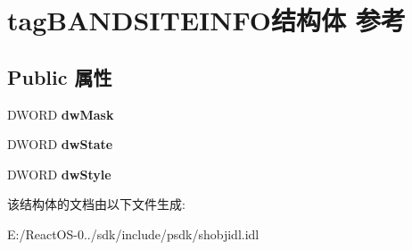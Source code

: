 \hypertarget{structtag_b_a_n_d_s_i_t_e_i_n_f_o}{}\section{tag\+B\+A\+N\+D\+S\+I\+T\+E\+I\+N\+F\+O结构体 参考}
\label{structtag_b_a_n_d_s_i_t_e_i_n_f_o}
\subsection*{Public 属性}
\begin{DoxyCompactItemize}
\item 
\mbox{\label{structtag_b_a_n_d_s_i_t_e_i_n_f_o_a87b805d515db9e05eb0433deb6575120}} 
D\+W\+O\+RD {\bfseries dw\+Mask}
\item 
\mbox{\label{structtag_b_a_n_d_s_i_t_e_i_n_f_o_a7fdfa734fd89f525f883cc0e4fff23fa}} 
D\+W\+O\+RD {\bfseries dw\+State}
\item 
\mbox{\label{structtag_b_a_n_d_s_i_t_e_i_n_f_o_a2ff14051af225fa890ee8947e448156c}} 
D\+W\+O\+RD {\bfseries dw\+Style}
\end{DoxyCompactItemize}


该结构体的文档由以下文件生成\+:\begin{DoxyCompactItemize}
\item 
E\+:/\+React\+O\+S-\/0../sdk/include/psdk/shobjidl.\+idl\end{DoxyCompactItemize}

